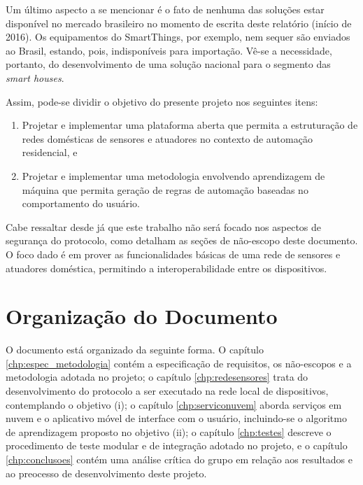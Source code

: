 Um último aspecto a se mencionar é o fato de nenhuma das soluções estar disponível no mercado brasileiro no momento de escrita deste relatório (início de 2016). Os equipamentos do SmartThings, por exemplo, nem sequer são enviados ao Brasil, estando, pois, indisponíveis para importação. Vê-se a necessidade, portanto, do desenvolvimento de uma solução nacional para o segmento das \textit{smart houses}.

Assim, pode-se dividir o objetivo do presente projeto nos seguintes itens:
\begin{enumerate}[\quad (i)]
	\item Projetar e implementar uma plataforma aberta que permita a estruturação de redes domésticas de sensores e atuadores no contexto de automação residencial, e
	\item Projetar e implementar uma metodologia envolvendo aprendizagem de máquina que permita geração de regras de automação baseadas no comportamento do usuário.
\end{enumerate}

Cabe ressaltar desde já que este trabalho não será focado nos aspectos de segurança do protocolo, como detalham as seções de não-escopo deste documento. O foco dado é em prover as funcionalidades básicas de uma rede de sensores e atuadores doméstica, permitindo a interoperabilidade entre os dispositivos.

\section{Organização do Documento}
O documento está organizado da seguinte forma. O capítulo \ref{chp:espec_metodologia} contém a especificação de requisitos, os não-escopos e a metodologia adotada no projeto; o capítulo \ref{chp:redesensores} trata do desenvolvimento do protocolo a ser executado na rede local de dispositivos, contemplando o objetivo (i); o capítulo \ref{chp:serviconuvem} aborda serviços em nuvem e o aplicativo móvel de interface com o usuário, incluindo-se o algoritmo de aprendizagem proposto no objetivo (ii); o capítulo \ref{chp:testes} descreve o procedimento de teste modular e de integração adotado no projeto, e o capítulo \ref{chp:conclusoes} contém uma análise crítica do grupo em relação aos resultados e ao preocesso de desenvolvimento deste projeto.